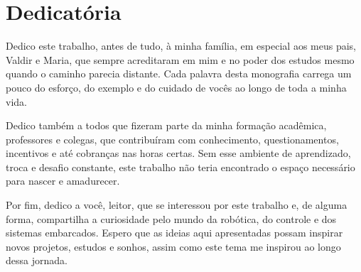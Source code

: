 \chapter*{Dedicat\'oria}
\vspace{2cm}
\begin{flushright}
    Dedico este trabalho, antes de tudo, \`a minha fam\'ilia, em especial
    aos meus pais, Valdir e Maria, que sempre acreditaram em mim e no
    poder dos estudos mesmo quando o caminho parecia distante. Cada
    palavra desta monografia carrega um pouco do esfor\c{c}o, do exemplo
    e do cuidado de voc\^es ao longo de toda a minha vida.

    Dedico tamb\'em a todos que fizeram parte da minha forma\c{c}\~ao
    acad\^emica, professores e colegas, que contribu\'iram com
    conhecimento, questionamentos, incentivos e at\'e cobran\c{c}as nas
    horas certas. Sem esse ambiente de aprendizado, troca e desafio
    constante, este trabalho n\~ao teria encontrado o espa\c{c}o
    necess\'ario para nascer e amadurecer.

    Por fim, dedico a voc\^e, leitor, que se interessou por este trabalho
    e, de alguma forma, compartilha a curiosidade pelo mundo da
    rob\'otica, do controle e dos sistemas embarcados. Espero que as
    ideias aqui apresentadas possam inspirar novos projetos, estudos e
    sonhos, assim como este tema me inspirou ao longo dessa jornada.
\end{flushright}
